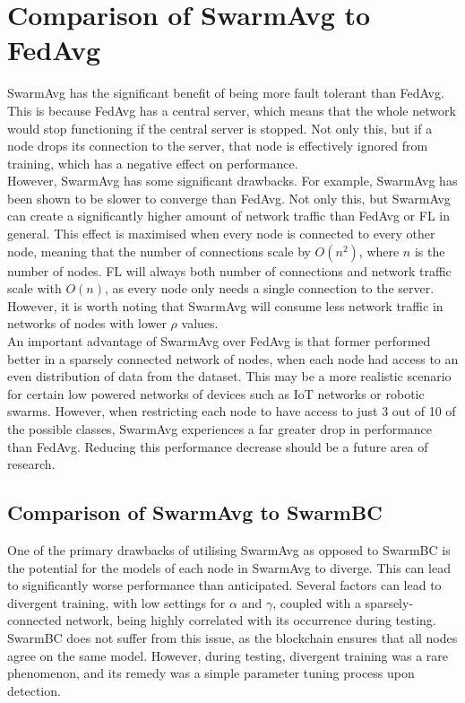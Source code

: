 \documentclass[letterpaper, 10 pt, conference]{ieeeconf}  %
\begin{document}
\section{Comparison of SwarmAvg to FedAvg}
SwarmAvg has the significant benefit of being more fault tolerant than FedAvg. This is because FedAvg has a central server, which means that the whole network would stop functioning if the central server is stopped. Not only this, but if a node drops its connection to the server, that node is effectively ignored from training, which has a negative effect on performance. \\

However, SwarmAvg has some significant drawbacks. For example, SwarmAvg has been shown to be slower to converge than FedAvg. Not only this, but SwarmAvg can create a significantly higher amount of network traffic than FedAvg or FL in general. This effect is maximised when every node is connected to every other node, meaning that the number of connections scale by $O(n^2)$, where $n$ is the number of nodes. FL will always both number of connections and network traffic scale with $O(n)$, as every node only needs a single connection to the server. However, it is worth noting that SwarmAvg will consume less network traffic in networks of nodes with lower $\rho$ values. \\

An important advantage of SwarmAvg over FedAvg is that former performed better in a sparsely connected network of nodes, when each node had access to an even distribution of data from the dataset. This may be a more realistic scenario for certain low powered networks of devices such as IoT networks or robotic swarms. However, when restricting each node to have access to just 3 out of 10 of the possible classes, SwarmAvg experiences a far greater drop in performance than FedAvg. Reducing this performance decrease should be a future area of research.

\subsection{Comparison of SwarmAvg to SwarmBC}
One of the primary drawbacks of utilising SwarmAvg as opposed to SwarmBC is the potential for the models of each node in SwarmAvg to diverge. This can lead to significantly worse performance than anticipated. Several factors can lead to divergent training, with low settings for $\alpha$ and $\gamma$, coupled with a sparsely-connected network, being highly correlated with its occurrence during testing. SwarmBC does not suffer from this issue, as the blockchain ensures that all nodes agree on the same model. However, during testing, divergent training was a rare phenomenon, and its remedy was a simple parameter tuning process upon detection. \\
\end{document}
